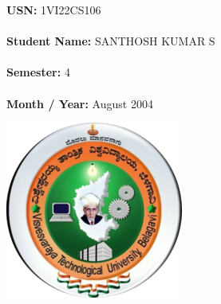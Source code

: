 \documentclass[a4paper,12pt]{article}
\begin{document}
\noindent
\begin{minipage}{0.7\textwidth}
\textbf{USN:} 1VI22CS106 \\\\
\textbf{Student Name:} SANTHOSH KUMAR S\\\\
\textbf{Semester: } 4\\\\
\textbf{Month / Year: } August 2004
\end{minipage}
\begin{minipage}{0.2\textwidth}
    \includegraphics[width=\textwidth]{vtulogo.png} %
\end{minipage}
\vspace{0.5cm}
\end{document}

